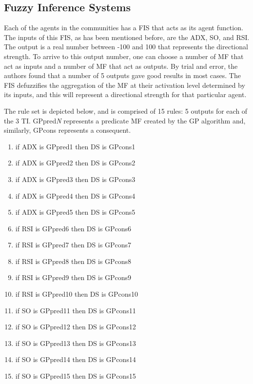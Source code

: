 \documentclass[12pt,journal,compsoc]{IEEEtran}
\begin{document}
\subsection{Fuzzy Inference Systems}

Each of the agents in the communities has a FIS that acts as its agent function. The inputs of this FIS, as has been mentioned before, are the ADX, SO, and RSI. The output is a real number between -100 and 100 that represents the directional strength. To arrive to this output number, one can choose a number of MF that act as inputs and a number of MF that act as outputs. By trial and error, the authors found that a number of 5 outputs gave good results in most cases. The FIS defuzzifies the aggregation of the MF at their activation level determined by its inputs, and this will represent a directional strength for that particular agent.

The rule set is depicted below, and is comprised of 15 rules: 5 outputs for each of the 3 TI. GPpred\textit{N} represents a predicate MF created by the GP algorithm and, similarly, GPcons represents a consequent.

\begin{enumerate}
\item if ADX is GPpred1 then DS is GPcons1
\item if ADX is GPpred2 then DS is GPcons2
\item if ADX is GPpred3 then DS is GPcons3
\item if ADX is GPpred4 then DS is GPcons4
\item if ADX is GPpred5 then DS is GPcons5

\item if RSI is GPpred6 then DS is GPcons6
\item if RSI is GPpred7 then DS is GPcons7
\item if RSI is GPpred8 then DS is GPcons8
\item if RSI is GPpred9 then DS is GPcons9
\item if RSI is GPpred10 then DS is GPcons10

\item if SO is GPpred11 then DS is GPcons11
\item if SO is GPpred12 then DS is GPcons12
\item if SO is GPpred13 then DS is GPcons13
\item if SO is GPpred14 then DS is GPcons14
\item if SO is GPpred15 then DS is GPcons15
\end{enumerate}
\end{document}
